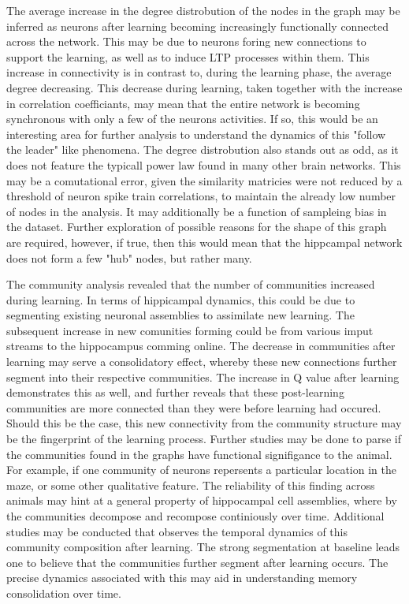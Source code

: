 \documentclass[9pt,twocolumn,twoside,lineno]{pnas-new}
\begin{document}
The average increase in the degree distrobution of the nodes in the graph may be inferred as neurons after learning becoming increasingly functionally connected across the network. This may be due to neurons foring new connections to support the learning, as well as to induce LTP processes within them. This increase in connectivity is in contrast to, during the learning phase,  the average degree decreasing. This decrease during learning, taken together with the increase in correlation coefficiants, may mean that the entire network is becoming synchronous with only a few of the neurons activities. If so, this would be an interesting area for further analysis to understand the dynamics of this "follow the leader" like phenomena. The degree distrobution also stands out as odd, as it does not feature the typicall power law found in many other brain networks. This may be a comutational error, given the similarity matricies were not reduced by a threshold of neuron spike train correlations, to maintain the already low number of nodes in the analysis. It may additionally be a function of sampleing bias in the dataset. Further exploration of possible reasons for the shape of this graph are required, however, if true, then this would mean that the hippcampal network does not form a few "hub" nodes, but rather many.

The community analysis revealed that the number of communities increased during learning. In terms of hippicampal dynamics, this could be due to segmenting existing neuronal assemblies to assimilate new learning. The subsequent increase in new comunities forming could be from various imput streams to the hippocampus comming online. The decrease in communities after learning may serve a consolidatory effect, whereby these new connections further segment into their respective communities. The increase in Q value after learning demonstrates this as well, and further reveals that these post-learning communities are more connected than they were before learning had occured. Should this be the case, this new connectivity from the community structure may be the fingerprint of the learning process. Further studies may be done to parse if the communities found in the graphs have functional signifigance to the animal. For example, if one community of neurons repersents a particular location in the maze, or some other qualitative feature. The reliability of this finding across animals may hint at a general property of hippocampal cell assemblies, where by the communities decompose and recompose continiously over time. Additional studies may be conducted that observes the temporal dynamics of this community composition after learning. The strong segmentation at baseline leads one to believe that the communities further segment after learning occurs. The precise dynamics associated with this may aid in understanding memory consolidation over time. 
\end{document}
